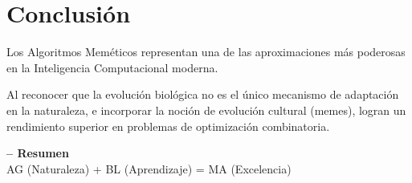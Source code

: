 \documentclass[notumble,10pt]{leaflet}
\begin{document}
\newpage

\section{Conclusión}

Los Algoritmos Meméticos representan una de las aproximaciones más poderosas en la Inteligencia Computacional moderna. 

Al reconocer que la evolución biológica no es el único mecanismo de adaptación en la naturaleza, e incorporar la noción de evolución cultural (memes), logran un rendimiento superior en problemas de optimización combinatoria.

\vspace{1cm}
\begin{tcolorbox}[colback=primary!10, colframe=primary, arc=5pt]
\centering
\Large\textbf{-- Resumen}\\
\vspace{0.3cm}
\normalsize AG (Naturaleza) + BL (Aprendizaje) = MA (Excelencia)
\end{tcolorbox}

\vfill
\end{document}
